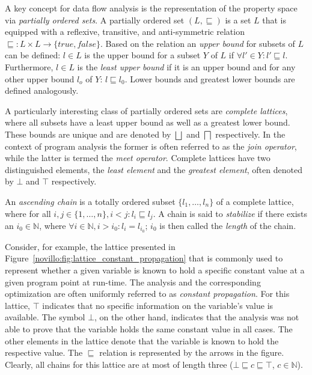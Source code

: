 A key concept for data flow analysis is the representation of the property
space via \emph{partially ordered sets}. A partially ordered set $(L,
\sqsubseteq)$ is a set $L$ that is equipped with a reflexive, transitive, and
anti-symmetric relation $\sqsubseteq\colon L \times L \rightarrow \{true, false\}$.
Based on the relation an \emph{upper bound} for subsets of $L$ can be defined:
$l \in L$ is the upper bound for a subset $Y$ of $L$ if $\forall l' \in Y\colon l'
\sqsubseteq l$. Furthermore, $l \in L$ is the \emph{least upper bound} if it is
an upper bound and for any other upper bound $l_o$ of $Y$: $l \sqsubseteq l_0$.
Lower bounds and greatest lower bounds are defined analogously.

A particularly interesting class of partially ordered sets are \emph{complete
lattices}, where all subsets have a least upper bound as well as a greatest
lower bound. These bounds are unique and are denoted by $\bigsqcup$ and
$\bigsqcap$ respectively. In the context of program analysis the former is often
referred to as the \emph{join operator}, while the latter is termed the
\emph{meet operator}. Complete lattices have two distinguished elements, the
\emph{least element} and the \emph{greatest element}, often denoted by $\bot$
and $\top$ respectively.

An \emph{ascending chain} is a totally ordered subset $\{l_1, \ldots, l_n \}$ of
a complete lattice, where for all $i, j \in \{1, \ldots, n\}, i < j \colon l_i
\sqsubseteq l_j$. A chain is said to \emph{stabilize} if there exists an $i_0
\in \mathbb{N}$, where $\forall i \in \mathbb{N}, i > i_0 \colon l_i = l_{i_0}$;
$i_0$ is then called the \emph{length} of the chain.

Consider, for example, the lattice presented in
Figure~\ref{novillo:fig:lattice_constant_propagation} that is commonly used to
represent whether a given variable is known to hold a specific constant value at
a given program point at run-time. The analysis and the corresponding
optimization are often uniformly referred to as \emph{constant propagation}.
For this lattice, $\top$ indicates that no specific information on the
variable's value is available. The symbol $\bot$, on the other hand, indicates
that the analysis was not able to prove that the variable holds the same
constant value in all cases. The other elements in the lattice denote that the
variable is known to hold the respective value. The $\sqsubseteq$ relation is
represented by the arrows in the figure. Clearly, all chains for this lattice
are at most of length three ($\bot \sqsubseteq c \sqsubseteq \top$, $c \in
\mathbb{N}$).

